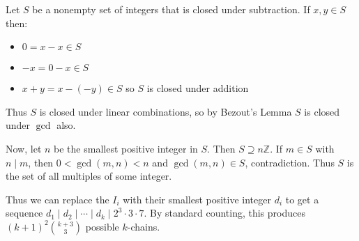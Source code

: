 Let $S$ be a nonempty set of integers that is closed under subtraction. If $x,y\in S$ then:
\begin{itemize}
	\item $0=x-x\in S$
	\item $-x=0-x\in S$
	\item $x+y=x-(-y)\in S$ so $S$ is closed under addition
\end{itemize}

Thus $S$ is closed under linear combinations, so by Bezout's Lemma $S$ is closed under $\gcd$ also.

Now, let $n$ be the smallest positive integer in $S$. Then $S\supseteq n\mathbb{Z}$. If $m\in S$ with $n\mid m$, then $0<\gcd(m,n)<n$ and $\gcd(m,n)\in S$, contradiction. Thus $S$ is the set of all multiples of some integer.

Thus we can replace the $I_i$ with their smallest positive integer $d_i$ to get a sequence $d_1\mid d_2\mid\cdots\mid d_k\mid 2^3\cdot3\cdot7$. By standard counting, this produces $\boxed{(k+1)^2\binom{k+3}{3}}$ possible $k$-chains.